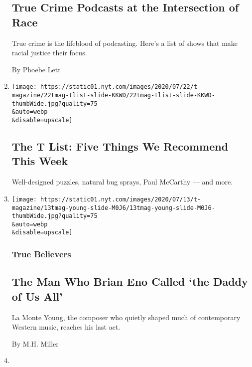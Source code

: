 \begin{enumerate}
  \hypertarget{true-crime-podcasts-at-the-intersection-of-race}{%
  \subsection{True Crime Podcasts at the Intersection of
  Race}\label{true-crime-podcasts-at-the-intersection-of-race}}

  True crime is the lifeblood of podcasting. Here's a list of shows that
  make racial justice their focus.

  By Phoebe Lett
\item
  \href{/2020/07/23/t-magazine/puzzles-bug-spray-tlist.html}{}

  \texttt{[image: https://static01.nyt.com/images/2020/07/22/t-magazine/22tmag-tlist-slide-KKWD/22tmag-tlist-slide-KKWD-thumbWide.jpg?quality=75\\\&auto=webp\\\&disable=upscale]}

  \hypertarget{the-t-list-five-things-we-recommend-this-week-1}{%
  \subsection{The T List: Five Things We Recommend This
  Week}\label{the-t-list-five-things-we-recommend-this-week-1}}

  Well-designed puzzles, natural bug sprays, Paul McCarthy --- and more.
\item
  \href{/2020/07/22/t-magazine/la-monte-young.html}{}

  \texttt{[image: https://static01.nyt.com/images/2020/07/13/t-magazine/13tmag-young-slide-M0J6/13tmag-young-slide-M0J6-thumbWide.jpg?quality=75\\\&auto=webp\\\&disable=upscale]}

  \hypertarget{true-believers}{%
  \subsubsection{True Believers}\label{true-believers}}

  \hypertarget{the-man-who-brian-eno-called-the-daddy-of-us-all}{%
  \subsection{The Man Who Brian Eno Called `the Daddy of Us
  All'}\label{the-man-who-brian-eno-called-the-daddy-of-us-all}}

  La Monte Young, the composer who quietly shaped much of contemporary
  Western music, reaches his last act.

  By M.H. Miller
\item
  \href{/2020/07/16/arts/things-to-do-weekend-coronavirus.html}{}


\end{enumerate}
